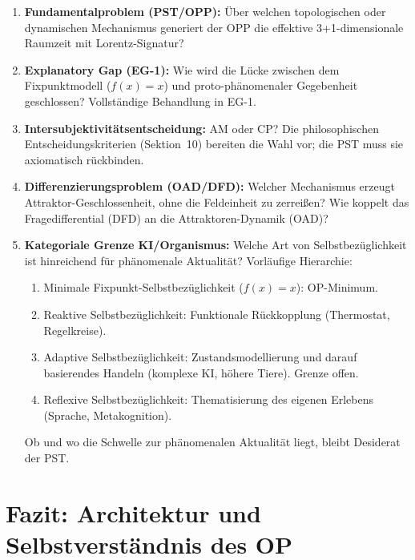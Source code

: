 \documentclass[11pt,a4paper]{article}
\theoremstyle{plain}
\theoremstyle{definition}
\begin{document}
\begin{enumerate}
  \item \textbf{Fundamentalproblem (PST/OPP):} \"{U}ber welchen topologischen oder
        dynamischen Mechanismus generiert der OPP die effektive 3+1-dimensionale
        Raumzeit mit Lorentz-Signatur?

  \item \textbf{Explanatory Gap (EG-1):} Wie wird die L\"{u}cke zwischen dem
        Fixpunktmodell ($f(x)=x$) und proto-ph\"{a}nomenaler Gegebenheit geschlossen?
        Vollst\"{a}ndige Behandlung in EG-1.

  \item \textbf{Intersubjektivit\"{a}tsentscheidung:} AM oder CP? Die philosophischen
        Entscheidungskriterien (Sektion~10) bereiten die Wahl vor; die PST muss sie
        axiomatisch r\"{u}ckbinden.

  \item \textbf{Differenzierungsproblem (OAD/DFD):} Welcher Mechanismus erzeugt
        Attraktor-Geschlossenheit, ohne die Feldeinheit zu zerrei\ss{}en? Wie koppelt
        das Fragedifferential (DFD) an die Attraktoren-Dynamik (OAD)?

  \item \textbf{Kategoriale Grenze KI/Organismus:} Welche Art von Selbstbez\"{u}glichkeit
        ist hinreichend f\"{u}r ph\"{a}nomenale Aktualit\"{a}t? Vorl\"{a}ufige Hierarchie:
        \begin{enumerate}[label=(\roman*)]
          \item Minimale Fixpunkt-Selbstbez\"{u}glichkeit ($f(x)=x$): OP-Minimum.
          \item Reaktive Selbstbez\"{u}glichkeit: Funktionale R\"{u}ckkopplung
                (Thermostat, Regelkreise).
          \item Adaptive Selbstbez\"{u}glichkeit: Zustandsmodellierung und darauf
                basierendes Handeln (komplexe KI, h\"{o}here Tiere). Grenze offen.
          \item Reflexive Selbstbez\"{u}glichkeit: Thematisierung des eigenen Erlebens
                (Sprache, Metakognition).
        \end{enumerate}
        Ob und wo die Schwelle zur ph\"{a}nomenalen Aktualit\"{a}t liegt, bleibt
        Desiderat der PST.
\end{enumerate}

\section{Fazit: Architektur und Selbstverst\"{a}ndnis des OP}
\end{document}
